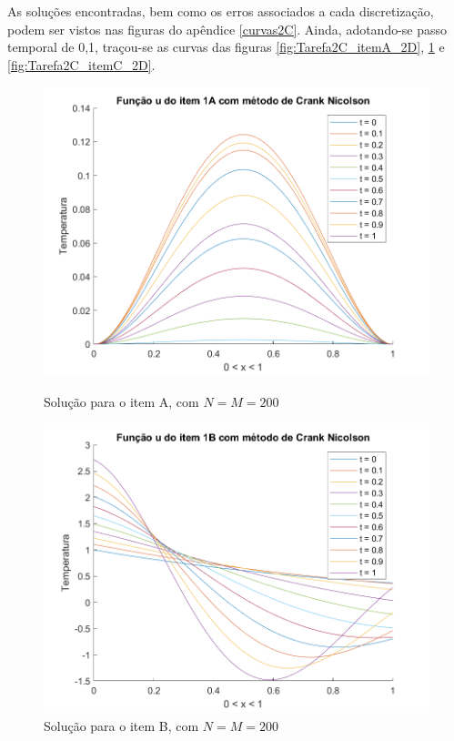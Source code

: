 \documentclass[12pt]{article}
\begin{document}
\begin{spacing}{1.5}
As soluções encontradas, bem como os erros associados a cada discretização, podem ser vistos nas figuras do apêndice \ref{curvas2C}. Ainda, adotando-se passo temporal de 0,1, traçou-se as curvas das figuras \ref{fig:Tarefa2C_itemA_2D}, \ref{fig:Tarefa2C_itemB_2D} e \ref{fig:Tarefa2C_itemC_2D}. 
\begin{figure}[ht!]
\centering
    \begin{minipage}[b]{0.45\linewidth}
    \includegraphics[width=1\linewidth]{Segunda_Tarefa/ItemC/itemA_2D.png}
    \caption{Solução para o item A, com $N=M=200$}
    \label{fig:Tarefa2C_itemA_2D}
\end{minipage}
\quad
\begin{minipage}[b]{0.45\linewidth}
    \includegraphics[width=1\linewidth]{Segunda_Tarefa/ItemC/itemB_2D.png}
    \caption{Solução para o item B, com $N=M=200$}
    \label{fig:Tarefa2C_itemB_2D}
\end{minipage}
\end{figure}


\end{spacing}
\end{document}
